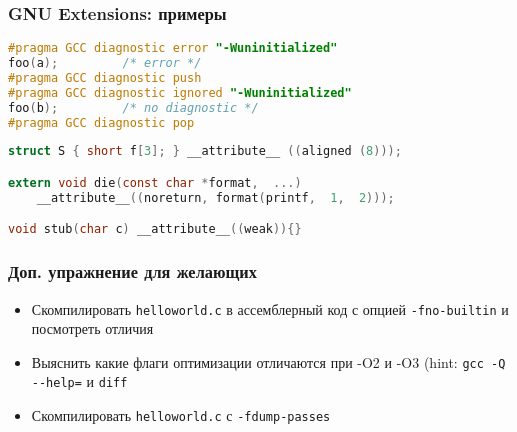 \begin{frame}[fragile]
\frametitle{GNU Extensions: примеры}

\begin{lstlisting}[language=C]
#pragma GCC diagnostic error "-Wuninitialized"
foo(a);         /* error */
#pragma GCC diagnostic push
#pragma GCC diagnostic ignored "-Wuninitialized"
foo(b);         /* no diagnostic */
#pragma GCC diagnostic pop
\end{lstlisting}

\begin{lstlisting}[language=C]
struct S { short f[3]; } __attribute__ ((aligned (8)));

extern void die(const char *format,  ...)
    __attribute__((noreturn, format(printf,  1,  2)));

void stub(char c) __attribute__((weak)){}
\end{lstlisting}
\end{frame}


\begin{frame}
  \frametitle{Доп. упражнение для желающих}
  \begin{itemize}
    \item Скомпилировать \texttt{helloworld.c} в ассемблерный код с опцией \texttt{-fno-builtin} и посмотреть отличия
    \item Выяснить какие флаги оптимизации отличаются при -O2 и -O3 (hint: \texttt{gcc -Q -{}-help=} и \texttt{diff}
    \item Скомпилировать \texttt{helloworld.c} с \texttt{-fdump-passes}
  \end{itemize}
\end{frame}
